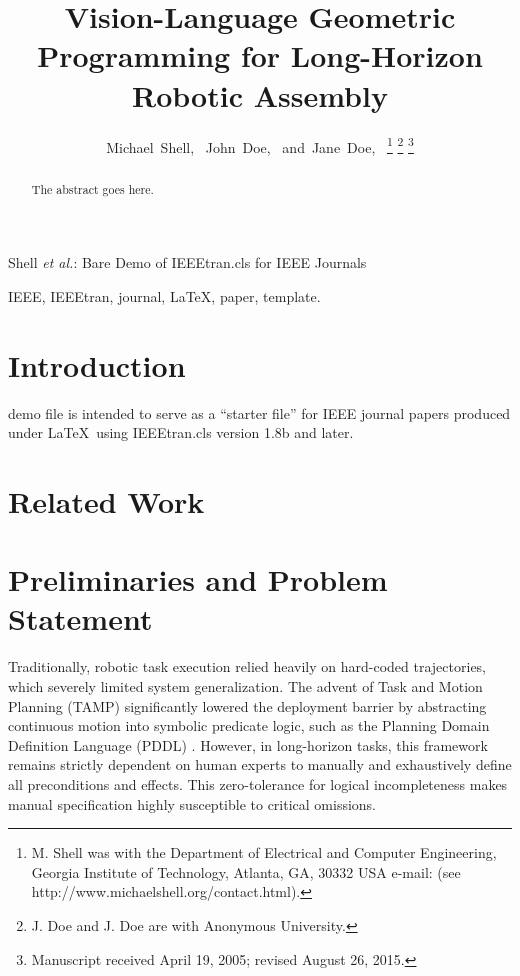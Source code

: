 \documentclass[journal]{IEEEtran}
\begin{document}
  \title{Vision-Language Geometric Programming for Long-Horizon Robotic Assembly}

  \author{Michael~Shell,~ John~Doe,~
  and~Jane~Doe,~
  \thanks{M. Shell was with the Department of Electrical and Computer Engineering,
  Georgia Institute of Technology, Atlanta, GA, 30332 USA e-mail: (see http://www.michaelshell.org/contact.html).}%
  \thanks{J. Doe and J. Doe are with Anonymous University.}%
  \thanks{Manuscript received April 19, 2005; revised August 26, 2015.}}

  {Shell \MakeLowercase{\textit{et al.}}: Bare Demo of IEEEtran.cls for IEEE Journals}

  \maketitle

  \begin{abstract}
    The abstract goes here.
  \end{abstract}

  \begin{IEEEkeywords}
    IEEE, IEEEtran, journal, \LaTeX, paper, template.
  \end{IEEEkeywords}

  \IEEEpeerreviewmaketitle

  \section{Introduction}

   demo file is intended to serve as a ``starter file'' for
  IEEE journal papers produced under \LaTeX\ using IEEEtran.cls version 1.8b and
  later.

  \section{Related Work}

  \section{Preliminaries and Problem Statement}
  \label{sec:preliminaries}

  Traditionally, robotic task execution relied heavily on hard-coded trajectories,
  which severely limited system generalization. The advent of Task and Motion Planning
  (TAMP) significantly lowered the deployment barrier by abstracting continuous motion
  into symbolic predicate logic, such as the Planning Domain Definition Language
  (PDDL) \cite{cite_pddl_1998}. However, in long-horizon tasks, this framework remains
  strictly dependent on human experts to manually and exhaustively define all preconditions
  and effects. This zero-tolerance for logical incompleteness makes manual
  specification highly susceptible to critical omissions.
\end{document}
